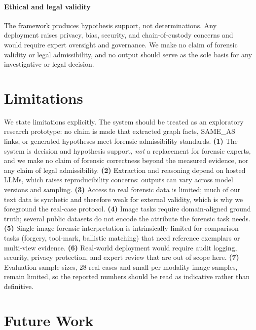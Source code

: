 \documentclass[conference]{IEEEtran}
\newcommand{\rel}[1]{\textup{\MakeUppercase{#1}}}
\begin{document}
\paragraph*{Ethical and legal validity} The framework produces hypothesis support,
not determinations. Any deployment raises privacy, bias, security, and
chain-of-custody concerns and would require expert oversight and governance. We
make no claim of forensic validity or legal admissibility, and no output should
serve as the sole basis for any investigative or legal decision.

\section{Limitations}
\label{sec:limitations}

We state limitations explicitly. The system should be treated as an exploratory
research prototype: no claim is made that extracted graph facts, \rel{same\_as}
links, or generated hypotheses meet forensic admissibility standards.
\textbf{(1)} The system is decision and hypothesis support, \emph{not} a
replacement for forensic experts, and we make no claim of forensic correctness
beyond the measured evidence, nor any claim of legal admissibility. \textbf{(2)} Extraction and reasoning depend on hosted LLMs,
which raises reproducibility concerns: outputs can vary across model versions and
sampling. \textbf{(3)} Access to real forensic data is limited; much of our
text data is synthetic and therefore weak for external validity, which is why we
foreground the real-case protocol. \textbf{(4)} Image tasks require
domain-aligned ground truth; several public datasets do not encode the attribute
the forensic task needs. \textbf{(5)} Single-image forensic interpretation is
intrinsically limited for comparison tasks (forgery, tool-mark, ballistic
matching) that need reference exemplars or multi-view evidence. \textbf{(6)}
Real-world deployment would require audit logging, security, privacy protection,
and expert review that are out of scope here. \textbf{(7)} Evaluation sample
sizes, 28 real cases and small per-modality image samples, remain limited, so
the reported numbers should be read as indicative rather than definitive.

\section{Future Work}
\label{sec:future}
\end{document}
